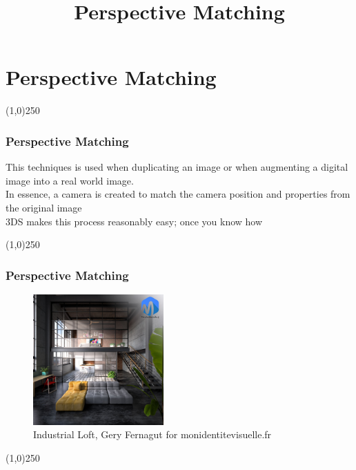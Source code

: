 \section{Perspective Matching}
\begin{frame}
	\title[Perspective Matching]{Perspective Matching}
	\titlepage
\end{frame}\begin{center}\line(1,0){250}\end{center}

\begin{frame}
	\frametitle{Perspective Matching}
	This techniques is used when duplicating an image or when augmenting a digital image into a real world image.\\
	In essence, a camera is created to match the camera position and properties from the original image\\
	3DS makes this process reasonably easy; once you know how
	
\end{frame}
\begin{center}\line(1,0){250}\end{center}


\begin{frame}
	\frametitle{Perspective Matching}
	\begin{figure}
		\centering
		\includegraphics[height=5cm]{./img/PerspectiveMatching/loft_large.jpg}
		\caption[Industrial Loft, Gery Fernagut for monidentitevisuelle.fr]{Industrial Loft, Gery Fernagut for monidentitevisuelle.fr}
		\label{fig:loftlarge}
	\end{figure}
	
\end{frame}
\begin{center}\line(1,0){250}\end{center}



